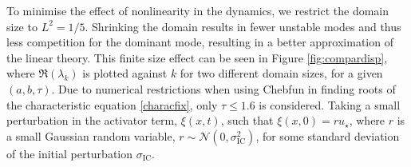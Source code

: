 To minimise the effect of nonlinearity in the dynamics, we restrict the domain size to $L^2=1/5$. Shrinking the domain results in fewer unstable modes and thus less competition for the dominant mode, resulting in a better approximation of the linear theory. This finite size effect can be seen in Figure \ref{fig:compardisp}, where $\Re(\lambda_k)$ is plotted against $k$ for two different domain sizes, for a given $(a,b,\tau)$. Due to numerical restrictions when using Chebfun in finding roots of the characteristic equation \eqref{characfix}, only $\tau\leq1.6$ is considered. Taking a small perturbation in the activator term, $\xi(x,t)$, such that $\xi(x,0)=ru_\star$, where $r$ is a small Gaussian random variable, $r\sim\mathcal{N}\left(0,\sigma_{\text{IC}}^2\right)$,
for some standard deviation of the initial perturbation $\sigma_{\text{IC}}$.

